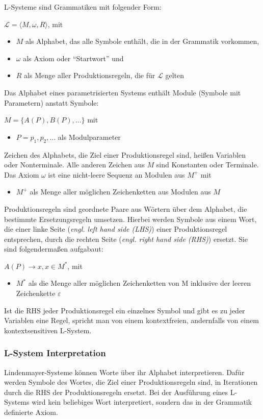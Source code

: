 L-Systeme sind Grammatiken mit folgender Form:
\begin{center}
    $\mathcal{L}=\langle M,\omega,R \rangle$, mit
    \begin{itemize}
        \item $M$ als Alphabet, das alle Symbole enthält, die in der Grammatik vorkommen,
        \item $\omega$ als Axiom oder "`Startwort"' und
        \item $R$ als Menge aller Produktionsregeln, die für $\mathcal{L}$ gelten
    \end{itemize}
\end{center}
Das Alphabet eines parametrisierten Systems enthält Module (Symbole mit Parametern) anstatt Symbole:
\begin{center}
    $M=\{A(P),B(P),\dots\}$ mit
    \begin{itemize}
        \item $P=p_1,p_2,\dots$ als Modulparameter
    \end{itemize}
\end{center}
Zeichen des Alphabets, die Ziel einer Produktionsregel sind, heißen Variablen oder Nonterminale.
Alle anderen Zeichen aus $M$ sind Konstanten oder Terminale.
Das Axiom $\omega$ ist eine nicht-leere Sequenz an Modulen aus $M^+$ mit
\begin{itemize}
    \item $M^+$ als Menge aller möglichen Zeichenketten aus Modulen aus $M$
\end{itemize}
Produktionsregeln sind geordnete Paare aus Wörtern über dem Alphabet, die bestimmte Ersetzungsregeln umsetzen.
Hierbei werden Symbole aus einem Wort, die einer linke Seite (\textit{engl. left hand side (LHS)}) einer
Produktionsregel entsprechen, durch die rechten Seite (\textit{engl. right hand side (RHS)}) ersetzt.
Sie sind folgendermaßen aufgabaut:
\begin{center}
    $A(P)\rightarrow x,x\in M^*$, mit
    \begin{itemize}
        \item $M^*$ als die Menge aller möglichen Zeichenketten von M inklusive der leeren Zeichenkette $\varepsilon$
    \end{itemize}
\end{center}
Ist die RHS jeder Produktionsregel ein einzelnes Symbol und gibt es zu jeder Variablen eine Regel, spricht man
von einem kontextfreien, andernfalls von einem kontextsensitiven L-System.

\subsubsection*{L-System Interpretation}
Lindenmayer-Systeme können Worte über ihr Alphabet interpretieren.
Dafür werden Symbole des Wortes, die Ziel einer Produktionsregeln sind, in Iterationen durch die RHS
der Produktionsregeln ersetzt.
Bei der Ausführung eines L-Systems wird kein beliebiges Wort interpretiert, sondern das in der
Grammatik definierte Axiom.

